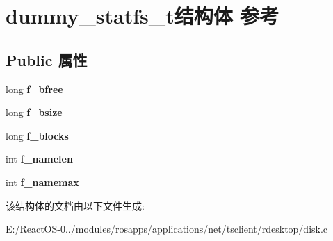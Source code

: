 \hypertarget{structdummy__statfs__t}{}\section{dummy\+\_\+statfs\+\_\+t结构体 参考}
\label{structdummy__statfs__t}
\subsection*{Public 属性}
\begin{DoxyCompactItemize}
\item 
\mbox{\label{structdummy__statfs__t_a5a3ec75dbe2bb316860ca4ed66c24a10}} 
long {\bfseries f\+\_\+bfree}
\item 
\mbox{\label{structdummy__statfs__t_a1e0bb98f37a292267a70867da57753ea}} 
long {\bfseries f\+\_\+bsize}
\item 
\mbox{\label{structdummy__statfs__t_a2ca231c7b615f1d6a5ceed33aa4b138b}} 
long {\bfseries f\+\_\+blocks}
\item 
\mbox{\label{structdummy__statfs__t_a4cdc06ccf82b48606c217fb2350d8730}} 
int {\bfseries f\+\_\+namelen}
\item 
\mbox{\label{structdummy__statfs__t_ab0e27421b44c9b90204c77e315986f10}} 
int {\bfseries f\+\_\+namemax}
\end{DoxyCompactItemize}


该结构体的文档由以下文件生成\+:\begin{DoxyCompactItemize}
\item 
E\+:/\+React\+O\+S-\/0../modules/rosapps/applications/net/tsclient/rdesktop/disk.\+c\end{DoxyCompactItemize}
